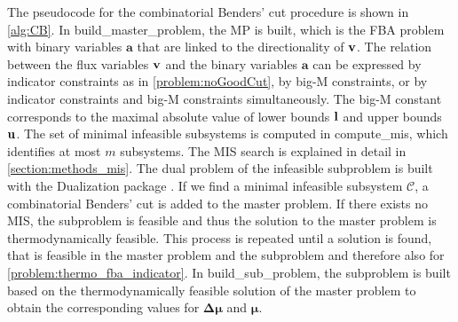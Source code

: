 The pseudocode for the combinatorial Benders' cut procedure is shown in \cref{alg:CB}. In \textsf{build\_master\_problem}, the MP is built, which is the FBA problem with binary variables $\boldsymbol a$ that are linked to the directionality of $\bold v$. The relation between the flux variables $\bold v$ and the binary variables $\boldsymbol a$ can be expressed by indicator constraints as in \cref{problem:noGoodCut}, by big-M constraints, or by indicator constraints and big-M constraints simultaneously. The big-M constant corresponds to the maximal absolute value of lower bounds $\bold l$ and upper bounds $\bold u$.
The set of minimal infeasible subsystems is computed in \textsf{compute\_mis}, which identifies at most $m$ subsystems. The MIS search is explained in detail in \cref{section:methods_mis}. The dual problem of the infeasible subproblem is built with the \textsf{Dualization} package \cite{dualization}.
If we find a minimal infeasible subsystem $\mathcal{C}$, a combinatorial Benders' cut is added to the master problem. If there exists no MIS, the subproblem is feasible and thus the solution to the master problem is thermodynamically feasible. 
This process is repeated until a solution is found, that is feasible in the master problem and the subproblem and therefore also for \cref{problem:thermo_fba_indicator}. In \textsf{build\_sub\_problem}, the subproblem is built based on the thermodynamically feasible solution of the master problem to obtain the corresponding values for $\boldsymbol{\Delta \mu}$ and $\boldsymbol \mu$. 

